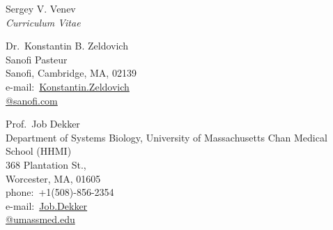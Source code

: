 \documentclass[10pt]{article}
\begin{document}
\begin{cv}{Sergey V. Venev\\{\large \itshape Curriculum Vitae}}
\begin{paracol}{3}
\switchcolumn

    Dr.\ Konstantin B. Zeldovich\\
    Sanofi Pasteur\\
    Sanofi, Cambridge, MA, 02139\\
    e-mail:\ \href{mailto:Konstantin.Zeldovich@sanofi.com}{Konstantin.Zeldovich\\\textrm{@}sanofi.com}

\switchcolumn

    Prof.\ Job Dekker\\
    Department of Systems Biology, University of Massachusetts Chan Medical School (HHMI)\\
    368 Plantation St.,\\ Worcester, MA, 01605\\
    phone:\ +1(508)-856-2354\\
    e-mail:\ \href{mailto:Job.Dekker@umassmed.edu}{Job.Dekker\\\textrm{@}umassmed.edu}



\end{paracol}




\end{cv}
\end{document}
